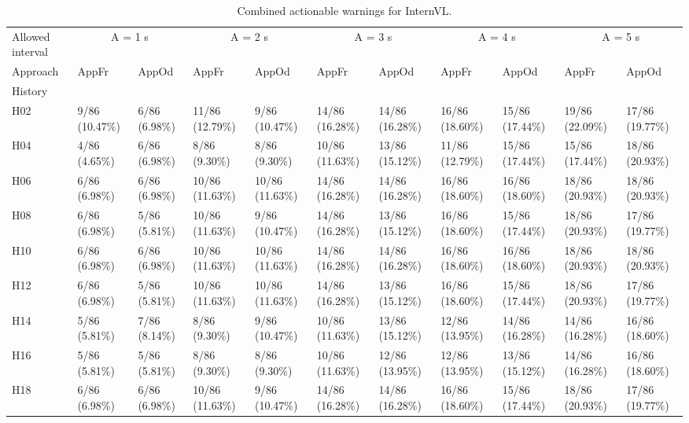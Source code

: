 \begin{table}[tbp]
\caption{Combined actionable warnings for InternVL.}
\label{tab:rq4-internvl-actionable-paper-table}
\begin{tabular}{lllllllllll}
\toprule
Allowed interval & \multicolumn{2}{c}{A = 1 s} & \multicolumn{2}{c}{A = 2 s} & \multicolumn{2}{c}{A = 3 s} & \multicolumn{2}{c}{A = 4 s} & \multicolumn{2}{c}{A = 5 s} \\
Approach & AppFr & AppOd & AppFr & AppOd & AppFr & AppOd & AppFr & AppOd & AppFr & AppOd \\
History &  &  &  &  &  &  &  &  &  &  \\
\midrule
H02 & 9/86 (10.47\%) & 6/86 (6.98\%) & 11/86 (12.79\%) & 9/86 (10.47\%) & 14/86 (16.28\%) & 14/86 (16.28\%) & 16/86 (18.60\%) & 15/86 (17.44\%) & 19/86 (22.09\%) & 17/86 (19.77\%) \\
H04 & 4/86 (4.65\%) & 6/86 (6.98\%) & 8/86 (9.30\%) & 8/86 (9.30\%) & 10/86 (11.63\%) & 13/86 (15.12\%) & 11/86 (12.79\%) & 15/86 (17.44\%) & 15/86 (17.44\%) & 18/86 (20.93\%) \\
H06 & 6/86 (6.98\%) & 6/86 (6.98\%) & 10/86 (11.63\%) & 10/86 (11.63\%) & 14/86 (16.28\%) & 14/86 (16.28\%) & 16/86 (18.60\%) & 16/86 (18.60\%) & 18/86 (20.93\%) & 18/86 (20.93\%) \\
H08 & 6/86 (6.98\%) & 5/86 (5.81\%) & 10/86 (11.63\%) & 9/86 (10.47\%) & 14/86 (16.28\%) & 13/86 (15.12\%) & 16/86 (18.60\%) & 15/86 (17.44\%) & 18/86 (20.93\%) & 17/86 (19.77\%) \\
H10 & 6/86 (6.98\%) & 6/86 (6.98\%) & 10/86 (11.63\%) & 10/86 (11.63\%) & 14/86 (16.28\%) & 14/86 (16.28\%) & 16/86 (18.60\%) & 16/86 (18.60\%) & 18/86 (20.93\%) & 18/86 (20.93\%) \\
H12 & 6/86 (6.98\%) & 5/86 (5.81\%) & 10/86 (11.63\%) & 10/86 (11.63\%) & 14/86 (16.28\%) & 13/86 (15.12\%) & 16/86 (18.60\%) & 15/86 (17.44\%) & 18/86 (20.93\%) & 17/86 (19.77\%) \\
H14 & 5/86 (5.81\%) & 7/86 (8.14\%) & 8/86 (9.30\%) & 9/86 (10.47\%) & 10/86 (11.63\%) & 13/86 (15.12\%) & 12/86 (13.95\%) & 14/86 (16.28\%) & 14/86 (16.28\%) & 16/86 (18.60\%) \\
H16 & 5/86 (5.81\%) & 5/86 (5.81\%) & 8/86 (9.30\%) & 8/86 (9.30\%) & 10/86 (11.63\%) & 12/86 (13.95\%) & 12/86 (13.95\%) & 13/86 (15.12\%) & 14/86 (16.28\%) & 16/86 (18.60\%) \\
H18 & 6/86 (6.98\%) & 6/86 (6.98\%) & 10/86 (11.63\%) & 9/86 (10.47\%) & 14/86 (16.28\%) & 14/86 (16.28\%) & 16/86 (18.60\%) & 15/86 (17.44\%) & 18/86 (20.93\%) & 17/86 (19.77\%) \\

\end{tabular}
\end{table}
